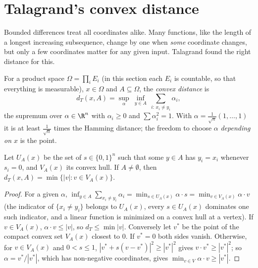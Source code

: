 \section{Talagrand's convex distance}

Bounded differences treat all coordinates alike. Many functions, like the length of a longest increasing subsequence, change by one when \emph{some} coordinate changes,
but only a few coordinates matter for any given input. Talagrand found the right distance for this.

For a product space $\Omega=\prod_iE_i$ (in this section each $E_i$ is countable, so that everything is measurable), $x\in\Omega$ and $A\subseteq\Omega$, the \emph{convex distance} is
\[
d_T(x,A)=\sup_{\alpha}\ \inf_{y\in A}\ \sum_{i:\,x_i\ne y_i}\alpha_i,
\]
the supremum over $\alpha\in\R^n$ with $\alpha_i\ge0$ and $\sum\alpha_i^2=1$. With $\alpha=\frac1{\sqrt n}(1,\dots,1)$ it is at least $\frac1{\sqrt n}$ times the Hamming distance; the freedom to
choose $\alpha$ \emph{depending on $x$} is the point.

\begin{lemma}\label{lem:dtgeom}
Let $U_A(x)$ be the set of $s\in\{0,1\}^n$ such that some $y\in A$ has $y_i=x_i$ whenever $s_i=0$, and $V_A(x)$ its convex hull. If $A\ne\emptyset$, then
$d_T(x,A)=\min\{|v|:v\in V_A(x)\}$.
\end{lemma}
\begin{proof}
For a given $\alpha$, $\inf_{y\in A}\sum_{x_i\ne y_i}\alpha_i=\min_{s\in U_A(x)}\alpha\cdot s=\min_{v\in V_A(x)}\alpha\cdot v$ (the indicator of $\{x_i\ne y_i\}$ belongs to $U_A(x)$, every $s\in U_A(x)$ dominates one
such indicator, and a linear function is minimized on a convex hull at a vertex). If $v\in V_A(x)$, $\alpha\cdot v\le|v|$, so $d_T\le\min|v|$. Conversely let $v^*$ be the point of the compact
convex set $V_A(x)$ closest to $0$. If $v^*=0$ both sides vanish. Otherwise, for $v\in V_A(x)$ and $0<s\le1$, $|v^*+s(v-v^*)|^2\ge|v^*|^2$ gives $v\cdot v^*\ge|v^*|^2$;
so $\alpha=v^*/|v^*|$, which has non-negative coordinates, gives $\min_{v\in V}\alpha\cdot v\ge|v^*|$.
\end{proof}

